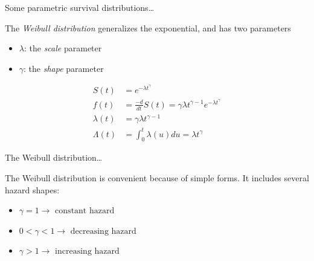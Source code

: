 \documentclass[ignorenonframetext,]{beamer}
\providecommand{\tightlist}{%
  \setlength{\itemsep}{0pt}\setlength{\parskip}{0pt}}
\begin{document}
\begin{frame}{%
\protect\hypertarget{some-parametric-survival-distributions-1}{%
Some parametric survival distributions\ldots}}

The \emph{Weibull distribution} generalizes the exponential, and has two
parameters

\begin{itemize}
\tightlist
\item
  \(\lambda\): the \emph{scale} parameter\\
\item
  \(\gamma\): the \emph{shape} parameter
\end{itemize}

\begin{align*}
S(t) &= e^{-\lambda t^\gamma} \\
f(t) &=  \frac{-d}{dt}S(t)=\gamma \lambda t^{\gamma-1}
e^{-\lambda t^\gamma}\\
\lambda(t) &= \gamma \lambda t^{\gamma-1}\\
\Lambda(t) &= \int_0^t\lambda(u) du = \lambda t^\gamma
\end{align*}

\end{frame}

\begin{frame}{%
\protect\hypertarget{the-weibull-distribution}{%
The Weibull distribution\ldots}}

The Weibull distribution is convenient because of simple forms. It
includes several hazard shapes:

\begin{itemize}
\item
  \(\gamma=1 \rightarrow \mbox{ constant hazard}\)
\item
  \(0<\gamma<1 \rightarrow \mbox{ decreasing hazard}\)
\item
  \(\gamma > 1 \rightarrow \mbox{ increasing hazard}\)
\end{itemize}

\end{frame}
\end{document}
